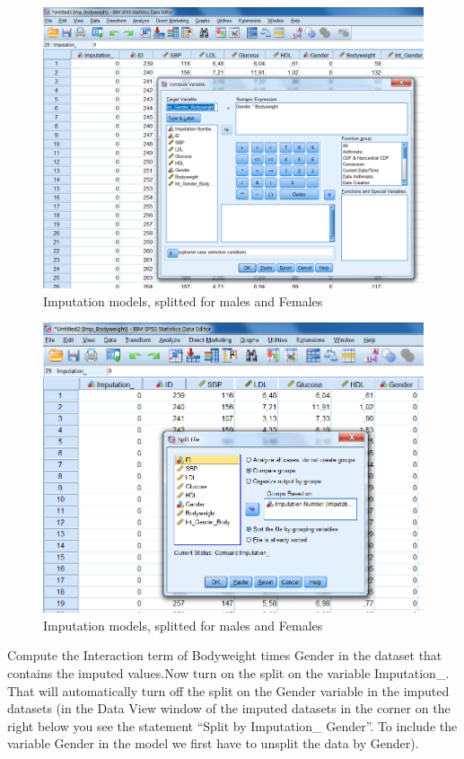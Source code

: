 \documentclass[]{book}
\theoremstyle{definition}
\theoremstyle{definition}
\theoremstyle{definition}
\theoremstyle{remark}
\begin{document}
\begin{figure}

{\centering \includegraphics[width=0.9\linewidth]{images/fig6.3} 

}

\caption{Imputation models, splitted for males and Females}\label{fig:fig6-3}
\end{figure}\begin{figure}

{\centering \includegraphics[width=0.9\linewidth]{images/fig6.4} 

}

\caption{Imputation models, splitted for males and Females}\label{fig:fig6-3}
\end{figure}

Compute the Interaction term of Bodyweight times Gender in the dataset
that contains the imputed values.Now turn on the split on the variable
Imputation\_. That will automatically turn off the split on the Gender
variable in the imputed datasets (in the Data View window of the imputed
datasets in the corner on the right below you see the statement ``Split
by Imputation\_ Gender''. To include the variable Gender in the model we
first have to unsplit the data by Gender).
\end{document}
